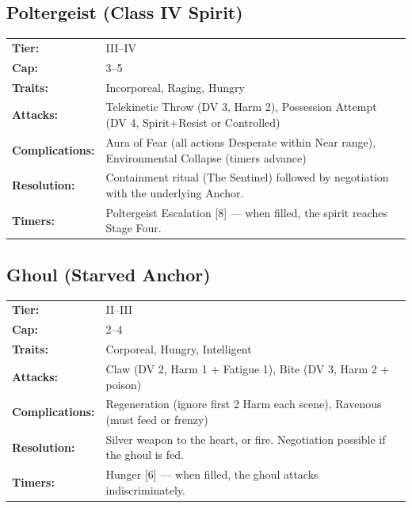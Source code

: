 \subsection{Poltergeist (Class IV Spirit)}
\begin{tabular}{@{}ll}
\textbf{Tier:} & III--IV \\
\textbf{Cap:} & 3--5 \\
\textbf{Traits:} & Incorporeal, Raging, Hungry \\
\textbf{Attacks:} & Telekinetic Throw (DV 3, Harm 2), Possession Attempt (DV 4, Spirit+Resist or Controlled) \\
\textbf{Complications:} & Aura of Fear (all actions Desperate within Near range), Environmental Collapse (timers advance) \\
\textbf{Resolution:} & Containment ritual (The Sentinel) followed by negotiation with the underlying Anchor. \\
\textbf{Timers:} & Poltergeist Escalation [8] --- when filled, the spirit reaches Stage Four. \\
\end{tabular}

\subsection{Ghoul (Starved Anchor)}
\begin{tabular}{@{}ll}
\textbf{Tier:} & II--III \\
\textbf{Cap:} & 2--4 \\
\textbf{Traits:} & Corporeal, Hungry, Intelligent \\
\textbf{Attacks:} & Claw (DV 2, Harm 1 + Fatigue 1), Bite (DV 3, Harm 2 + poison) \\
\textbf{Complications:} & Regeneration (ignore first 2 Harm each scene), Ravenous (must feed or frenzy) \\
\textbf{Resolution:} & Silver weapon to the heart, or fire. Negotiation possible if the ghoul is fed. \\
\textbf{Timers:} & Hunger [6] --- when filled, the ghoul attacks indiscriminately. \\
\end{tabular}

